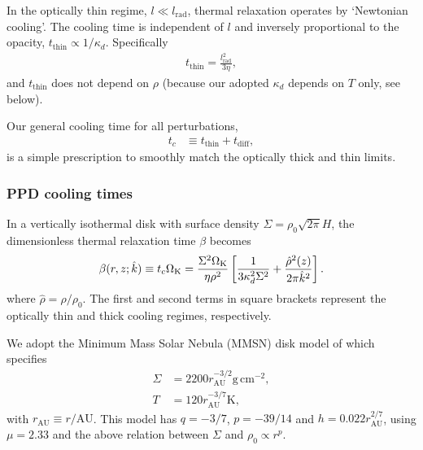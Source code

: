 In the optically thin regime, $l\ll 
l_\mathrm{rad}$, thermal relaxation operates by `Newtonian cooling'.
The cooling time is independent of $l$ and 
inversely proportional to the opacity, $t_\mathrm{thin} \propto 1/\kappa_d$. 
Specifically 
\begin{align}
  t_\mathrm{thin} = \frac{l_\mathrm{rad}^2}{3\eta},
\end{align}
and $t_\mathrm{thin}$ does not depend on $\rho$ (because our adopted
$\kappa_d$ depends on $T$ only, see below). 

Our general cooling time for all perturbations,
\begin{align}\label{tc_def}
  t_c &\equiv t_\mathrm{thin} + t _\mathrm{diff},%
\end{align}
is a simple prescription to smoothly match the optically thick and thin limits.

\subsubsection{PPD cooling times}\label{toy_relax}
In a vertically isothermal disk with surface density $\Sigma = \rho_0\sqrt{2\pi}H$, 
the dimensionless thermal
relaxation time $\beta$ becomes 
\begin{align}\label{real_beta}
  \beta(r,z;\hat{k}) \equiv t_c\Omega_{\rm K} =
  \frac{\Sigma^2\Omega_{\rm K}}{\eta\rho^2}\left[\frac{1}{3\kappa_d^2\Sigma^2} 
    + \frac{\hat{\rho}^2(z)}{2\pi \hat{k}^2}\right].
\end{align}
where $\hat{\rho} = \rho/\rho_0$.  The first and second terms in
square brackets represent the optically thin and thick cooling
regimes, respectively. 

We adopt the Minimum Mass Solar Nebula
(MMSN) disk model of \cite{chiang10} which specifies
\begin{subequations}
\begin{align}
\label{mmsn_sigma}
  \Sigma &= 2200 %
 r_\mathrm{AU}^{-3/2} \mathrm{g}\,\mathrm{cm}^{-2},  \\
 T &= 120%
  r_\mathrm{AU}^{-3/7} \mathrm{K}, \label{mmsn_temp}  
\end{align}\end{subequations}
with $r_\mathrm{AU}\equiv r/\mathrm{AU}$. This model has $q = -3/7$,
$p = -39/14$ and $h  = 0.022 r_\mathrm{AU}^{2/7}$, using $\mu = 2.33$
and the above relation between $\Sigma$ and $\rho_0 \propto r^p$.   

